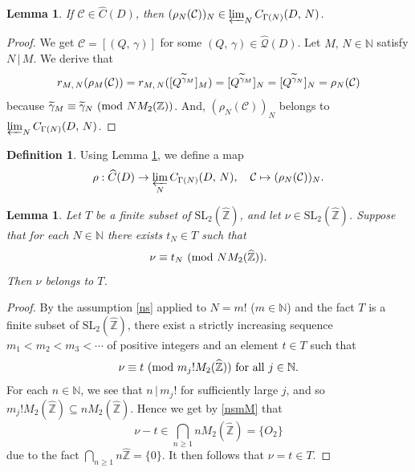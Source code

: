 \documentclass[reqno,11pt]{article}
\newcommand{\Mod}[1]{\ (\textup{mod}\ #1)}
\theoremstyle{plain} %
\newtheorem{lemma}[theorem]{\indent\sc Lemma}
\theoremstyle{definition} %
\newtheorem{definition}[theorem]{\indent\sc Definition}
\begin{document}
\begin{lemma}\label{Cwelldefined}
If $\mathcal{C}\in\widehat{C}(D)$, then
$(\rho_N(\mathcal{C}))_N\in\varprojlim_N C_{\Gamma(N)}(D,\,N)$. 
\end{lemma}
\begin{proof}
We get $\mathcal{C}=[(Q,\,\gamma)]$ for some $(Q,\,\gamma)\in\widehat{\mathcal{Q}}(D)$. 
Let $M,\,N\in\mathbb{N}$ satisfy $N\,|\,M$. 
We derive that
\begin{equation*}
r_{M,\,N}(\rho_M(\mathcal{C}))=r_{M,\,N}([Q^{\widetilde{\gamma}_M}]_M)
=[Q^{\widetilde{\gamma}_M}]_N\\
=[Q^{\widetilde{\gamma}_N}]_N=\rho_N(\mathcal{C})
\end{equation*}
because $\widetilde{\gamma}_M\equiv\widetilde{\gamma}_N\Mod{NM_2(\mathbb{Z})}$. 
And, $(\rho_N(\mathcal{C}))_N$ belongs to $\varprojlim_N C_{\Gamma(N)}(D,\,N)$.
\end{proof}

\begin{definition}\label{rDef}
Using Lemma \ref{Cwelldefined}, we define a map
\begin{equation*}
\rho:\widehat{C}(D)\rightarrow
\varprojlim_N C_{\Gamma(N)}(D,\,N),\quad\mathcal{C}\mapsto(\rho_N(\mathcal{C}))_N.
\end{equation*}
\end{definition}

\begin{lemma}\label{finite}
Let $T$ be a finite subset of $\mathrm{SL}_2(\widehat{\mathbb{Z}})$, and let $\nu\in\mathrm{SL}_2(\widehat{\mathbb{Z}})$.
Suppose that
for each $N\in\mathbb{N}$ there exists $t_N\in T$ such that
\begin{equation}\label{ns}
\nu\equiv t_N\Mod{NM_2(\widehat{\mathbb{Z}})}.
\end{equation}
Then $\nu$ belongs to $T$. 
\end{lemma}
\begin{proof}
By the assumption \eqref{ns} 
applied to $N=m!$ ($m\in\mathbb{N}$)
and the fact $T$ is a finite subset of $\mathrm{SL}_2(\widehat{\mathbb{Z}})$, 
there exist a strictly increasing sequence $m_1<m_2<m_3<\cdots$ of positive integers
and an element $t\in T$ such that
\begin{equation}\label{nsmM}
\nu\equiv t\Mod{m_j!M_2(\widehat{\mathbb{Z}})}~\text{for all}~j\in\mathbb{N}.  
\end{equation}
For each $n\in\mathbb{N}$, we see that
$n\,|\,m_j!$ for sufficiently large $j$, and so
$m_j!M_2(\widehat{\mathbb{Z}})\subseteq
nM_2(\widehat{\mathbb{Z}})$. 
Hence we get by \eqref{nsmM} that
\begin{equation*}
\nu-t\in\bigcap_{n\geq1}nM_2(\widehat{\mathbb{Z}})=\{O_2\}
\end{equation*}
due to the fact $\bigcap_{n\geq1}n\widehat{\mathbb{Z}}=\{0\}$. It then follows that
$\nu=t\in T$. 
\end{proof}
\end{document}
